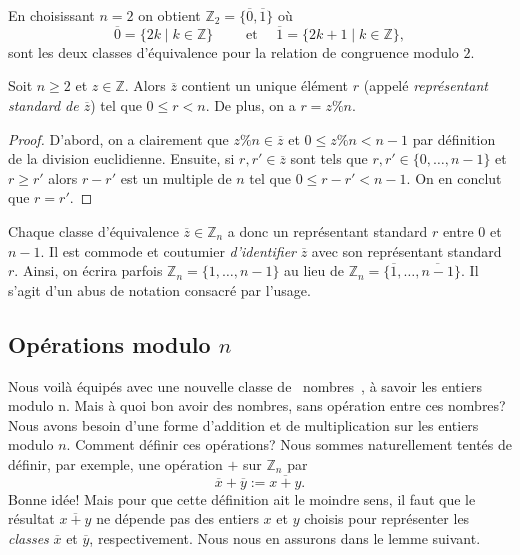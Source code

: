 \documentclass[french,course,oneside,theoremnosection]{lecture}
\newcommand{\Z}{\mathbb{Z}}
\begin{document}
\begin{example}
En choisissant $n=2$ on obtient $\Z_2=\{\overline{0}, \overline{1}\}$ où
\[
\overline{0}=\{2k \mid k \in \Z\} \qquad \text{ et } \quad \overline{1}= \{2k+1 \mid k \in \Z\},
\]
sont les deux classes d'équivalence pour la relation de congruence modulo $2$.
\end{example}
\begin{lemma}
Soit $n\geq 2$ et $z\in \Z$. Alors $\overline{z}$ contient un unique élément $r$ (appelé \emph{représentant standard de $\overline{z}$}) tel que $0\leq r <n$. De plus, on a $r=z\%n$.
\end{lemma}
\begin{proof}
D'abord, on a clairement que $z\%n \in \overline{z}$ et $0 \leq z\%n < n-1$ par définition de la division euclidienne. Ensuite, si $r,r'\in \overline{z}$ sont tels que $r,r'\in \{0, \ldots, n-1\}$ et $r\geq r'$ alors $r-r'$ est un multiple de $n$ tel que $0\leq r-r'<n-1$. On en conclut que $r=r'$.
\end{proof}

\begin{notation}
Chaque classe d'équivalence $\overline{z}\in \Z_n$ a donc un représentant standard $r$ entre 0 et $n-1$. Il est commode et coutumier \emph{d'identifier} $\overline{z}$ avec son représentant standard $r$. Ainsi, on écrira parfois $\Z_n=\{1, \ldots, n-1\}$  au lieu de $\Z_n=\{\overline{1}, \ldots, \overline{n-1}\}$. Il s'agit d'un abus de notation consacré par l'usage.
\end{notation}
\subsection{Opérations modulo $n$}
Nous voilà équipés avec une nouvelle classe de \og~nombres~\fg{}, à savoir les entiers modulo n. Mais à quoi bon avoir des nombres, sans opération entre ces nombres? Nous avons besoin d'une forme d'addition et de multiplication sur les entiers modulo $n$. Comment définir ces opérations? Nous sommes naturellement tentés de définir, par exemple, une opération $+$ sur $\Z_n$ par
\[
\overline{x}+\overline{y}:=\overline{x+y}.
\]
Bonne idée! Mais pour que cette définition ait le moindre sens, il faut que le résultat $\overline{x+y}$ ne dépende pas des entiers $x$ et $y$ choisis pour représenter les \emph{classes} $\overline{x}$ et $\overline{y}$, respectivement. Nous nous en assurons dans le lemme suivant.
\end{document}
